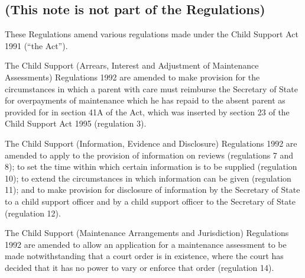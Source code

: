 \documentclass[12pt,a4paper]{article}
\begin{document}
\subsection*{(This note is not part of the Regulations)}

 These Regulations amend various regulations made under the Child Support Act 1991 (“the Act”).

  The Child Support (Arrears, Interest and Adjustment of Maintenance Assessments) Regulations 1992 are amended to make provision for the circumstances in which a parent with care must reimburse the Secretary of State for overpayments of maintenance which he has repaid to the absent parent as provided for in section 41A of the Act, which was inserted by section 23 of the Child Support Act 1995 (regulation 3).

  The Child Support (Information, Evidence and Disclosure) Regulations 1992 are amended to apply to the provision of information on reviews (regulations 7 and 8); to set the time within which certain information is to be supplied (regulation 10); to extend the circumstances in which information can be given (regulation 11); and to make provision for disclosure of information by the Secretary of State to a child support officer and by a child support officer to the Secretary of State (regulation 12).

  The Child Support (Maintenance Arrangements and Jurisdiction) Regulations 1992 are amended to allow an application for a maintenance assessment to be made notwithstanding that a court order is in existence, where the court has decided that it has no power to vary or enforce that order (regulation 14).
\end{document}
